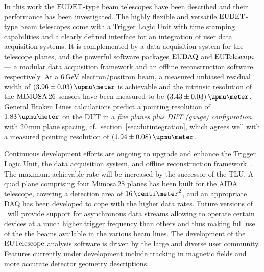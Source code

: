 

In this work the $\textrm{EUDET}$-type beam telescopes have been described and their performance has been investigated. 
The highly flexible and versatile $\textrm{EUDET}$-type beam telescopes come with a Trigger Logic Unit with time stamping capabilities and a clearly defined interface for an integration of user data acquisition systems.
It is complemented by a data acquisition system for the telescope planes, and the powerful software packages $\textrm{EUDAQ}$ and $\textrm{EUTelescope}$
 ---  a modular data acquisition framework and an offline reconstruction software, respectively. 
At a 6\,GeV electron/positron beam, a measured unbiased residual width of $(3.96 \pm 0.03)\,\upmu\meter$ is achievable
 and the intrinsic resolution of the $\textrm{MIMOSA\,26}$ sensors have been measured to be $(3.43 \pm 0.03)\,\upmu\meter$.
General Broken Lines calculations predict a pointing resolution of $1.83\,\upmu\meter$ on the DUT in a \textit{five planes plus DUT (gauge) configuration} with 20\,mm plane spacing,
 cf.~section~\ref{sec:dutintegration},
 which agrees well with a measured pointing resolution of $(1.94 \pm 0.08)\,\upmu\meter$.

Continuous development efforts are ongoing to upgrade and enhance the Trigger Logic Unit, the data acquisition system, and offline reconstruction framework~\cite{ref:tipp2014_eudaq}.  
The maximum achievable rate will be increased by the successor of the TLU. 
A quad plane comprising four Mimosa\,28 planes has been built for the AIDA telescope, covering a detection area of $16\,\centi\meter^2$, and an appropriate DAQ has been developed to cope with the higher data rates. 
Future versions of \eudaq\ will provide support for asynchronous data streams allowing to operate certain devices at a much higher trigger frequency than others
 and thus making full use of the the beams available in the various beam lines.
The development of the $\textrm{EUTelescope}$ analysis software is driven by the large and diverse user community. 
Features currently under development include tracking in magnetic fields and more accurate detector geometry descriptions. 
